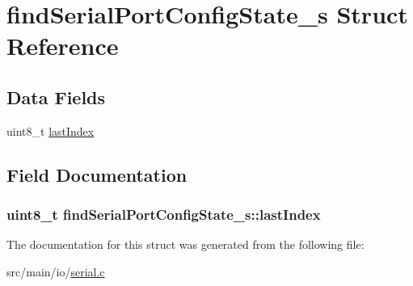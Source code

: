 \hypertarget{structfindSerialPortConfigState__s}{\section{find\+Serial\+Port\+Config\+State\+\_\+s Struct Reference}
\label{structfindSerialPortConfigState__s}
}
\subsection*{Data Fields}
\begin{DoxyCompactItemize}
\item 
uint8\+\_\+t \hyperlink{structfindSerialPortConfigState__s_ab612abbe13a0913079a47d3c172eeae3}{last\+Index}
\end{DoxyCompactItemize}


\subsection{Field Documentation}
\hypertarget{structfindSerialPortConfigState__s_ab612abbe13a0913079a47d3c172eeae3}{
\subsubsection[{last\+Index}]{\setlength{\rightskip}{0pt plus 5cm}uint8\+\_\+t find\+Serial\+Port\+Config\+State\+\_\+s\+::last\+Index}}\label{structfindSerialPortConfigState__s_ab612abbe13a0913079a47d3c172eeae3}


The documentation for this struct was generated from the following file\+:\begin{DoxyCompactItemize}
\item 
src/main/io/\hyperlink{io_2serial_8c}{serial.\+c}\end{DoxyCompactItemize}
